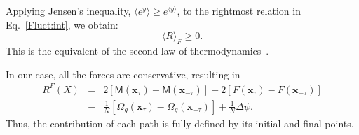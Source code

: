 \documentclass[9pt,twocolumn,twoside]{gsajnl}
\begin{document}
Applying Jensen's inequality, $\langle e^y \rangle \ge e^{\langle y \rangle}$, to the rightmost relation in Eq.~\eqref{Fluct:int}, we obtain:
\begin{equation} \label{Fluct:int:J}
\langle R \rangle_F \ge 0.
\end{equation}
This is the equivalent of the second law of thermodynamics~\citep{Jarzynski1997,Mustonen2010,Pitaevskii2011}.

In our case, all the forces are conservative, resulting in
\begin{eqnarray} \label{R:comp}
R^F (X) &=& 2 [ \mathsf{M} (\mathbf{x}_{\tau}) - \mathsf{M} (\mathbf{x}_{-\tau}) ] + 2 [ F(\mathbf{x}_{\tau}) - F(\mathbf{x}_{-\tau}) ] \nonumber \\
              &-& \frac{1}{N} [ \Omega_g (\mathbf{x}_{\tau}) - \Omega_g (\mathbf{x}_{-\tau})] + \frac{1}{N} \Delta \psi.
\end{eqnarray}
Thus, the contribution of each path is fully defined by its initial and final points. %

\end{document}
